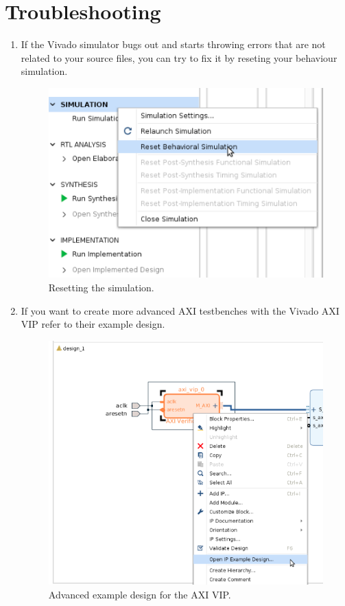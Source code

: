 \documentclass[12pt]{article}
\begin{document}
\section*{Troubleshooting}
\begin{enumerate}
\item If the Vivado simulator bugs out and starts throwing errors that are not related to your source files, you can try to fix it by reseting your behaviour simulation.
		\begin{figure}[H]
		  \centering
		  \includegraphics[scale=0.5]{troubleshoot1.png}
		  \caption{Resetting the simulation.}
		  \label{fig:roubleshoot1}
		\end{figure} 
\item If you want to create more advanced AXI testbenches with the Vivado AXI VIP refer to their example design.
		\begin{figure}[H]
		  \centering
		  \includegraphics[scale=0.5]{exdesign.png}
		  \caption{Advanced example design for the AXI VIP.}
		  \label{fig:exdesign}
		\end{figure} 
\end{enumerate}
\end{document}
